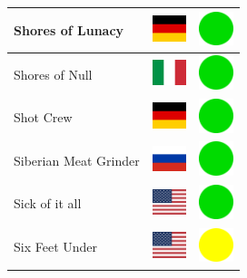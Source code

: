 \documentclass[12pt, a4paper, twoside]{report}
\begin{document}
\begin{center}
\begin{longtable}{|p{5cm}|p{2cm}|p{2cm}|}
Shores of Lunacy & \includegraphics[width=1cm]{4x3/de} & \includegraphics[width=1cm]{likes/y} \\ \hline
Shores of Null & \includegraphics[width=1cm]{4x3/it} & \includegraphics[width=1cm]{likes/y} \\ \hline
Shot Crew & \includegraphics[width=1cm]{4x3/de} & \includegraphics[width=1cm]{likes/y} \\ \hline
Siberian Meat Grinder & \includegraphics[width=1cm]{4x3/ru} & \includegraphics[width=1cm]{likes/y} \\ \hline
Sick of it all & \includegraphics[width=1cm]{4x3/us} & \includegraphics[width=1cm]{likes/y} \\ \hline
Six Feet Under & \includegraphics[width=1cm]{4x3/us} & \includegraphics[width=1cm]{likes/m} \\ \hline

\end{longtable}
\end{center}
\end{document}
